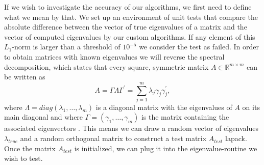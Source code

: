 \documentclass[12pt]{article}
\begin{document}
If we wish to investigate the accuracy of our algorithms, we first need to define what we mean by that. We set up an environment of unit tests that compare the absolute difference between the vector of true eigenvalues of a matrix and the vector of computed eigenvalues by our custom algorithms. If any element of this $L_1$-norm is larger than a threshold of $10^{-5}$ we consider the test as failed. In order to obtain matrices with known eigenvalues we will reverse the spectral decomposition, which states that every square, symmetric matrix $A \in \mathbb{R}^{m \times m}$ can be written as
\begin{equation}
\label{spectral-decomp}
A = \Gamma \Lambda \Gamma^{\prime} = \sum\limits_{j=1}^m \lambda_j \gamma_j \gamma^{\prime}_j,
\end{equation}
where $\Lambda = diag(\lambda_1, \dots, \lambda_m)$ is a diagonal matrix with the eigenvalues of $A$ on its main diagonal and where $\Gamma=(\gamma_1, \dots, \gamma_m)$ is the matrix containing the associated eigenvectors \citep{MVA}. This means we can draw a random vector of eigenvalues $\lambda_{true}$ and a random orthogonal matrix to construct a test matrix $A_{test}$ \citep{MVA}{lapack}. Once the matrix $A_{test}$ is initialized, we can plug it into the eigenvalue-routine we wish to test.
\end{document}
